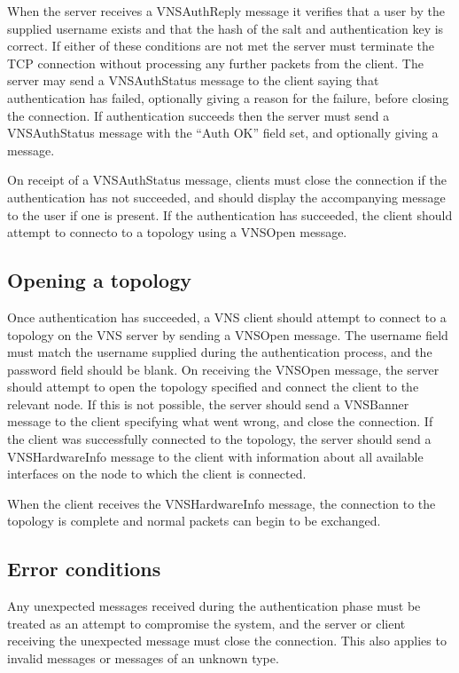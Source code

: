\documentclass[a4paper,12pt]{report}
\begin{document}
When the server receives a VNSAuthReply message it verifies that a user by the supplied username exists and that the hash of the salt and authentication key is correct.  If either of these conditions are not met the server must terminate the TCP connection without processing any further packets from the client.  The server may send a VNSAuthStatus message to the client saying that authentication has failed, optionally giving a reason for the failure, before closing the connection.  If authentication succeeds then the server must send a VNSAuthStatus message with the ``Auth OK'' field set, and optionally giving a message.

On receipt of a VNSAuthStatus message, clients must close the connection if the authentication has not succeeded, and should display the accompanying message to the user if one is present.  If the authentication has succeeded, the client should attempt to connecto to a topology using a VNSOpen message.

\subsection{Opening a topology}
Once authentication has succeeded, a VNS client should attempt to connect to a topology on the VNS server by sending a VNSOpen message.  The username field must match the username supplied during the authentication process, and the password field should be blank.  On receiving the VNSOpen message, the server should attempt to open the topology specified and connect the client to the relevant node.  If this is not possible, the server should send a VNSBanner message to the client specifying what went wrong, and close the connection.  If the client was successfully connected to the topology, the server should send a VNSHardwareInfo message to the client with information about all available interfaces on the node to which the client is connected.

When the client receives the VNSHardwareInfo message, the connection to the topology is complete and normal packets can begin to be exchanged.

\subsection{Error conditions}
Any unexpected messages received during the authentication phase must be treated as an attempt to compromise the system, and the server or client receiving the unexpected message must close the connection.  This also applies to invalid messages or messages of an unknown type.
\end{document}

